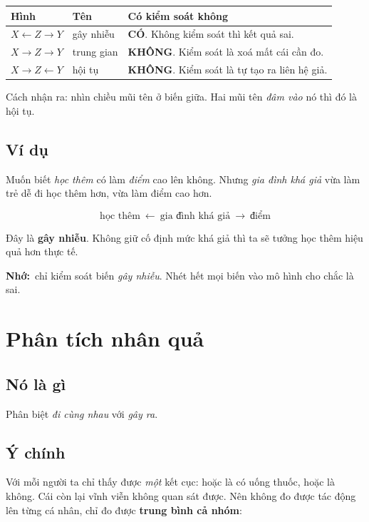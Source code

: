 \documentclass[12pt]{article}
\newcommand{\nho}{\textbf{Nhớ:}\ }
\begin{document}
\begin{center}
\begin{tabular}{@{}llp{5.6cm}@{}}
\toprule
\textbf{Hình} & \textbf{Tên} & \textbf{Có kiểm soát không} \\
\midrule
$X \leftarrow Z \to Y$ & gây nhiễu & \textbf{CÓ}. Không kiểm soát thì kết quả sai. \\
$X \to Z \to Y$ & trung gian & \textbf{KHÔNG}. Kiểm soát là xoá mất cái cần đo. \\
$X \to Z \leftarrow Y$ & hội tụ & \textbf{KHÔNG}. Kiểm soát là tự tạo ra liên hệ giả. \\
\bottomrule
\end{tabular}
\end{center}

Cách nhận ra: nhìn chiều mũi tên ở biến giữa. Hai mũi tên \emph{đâm vào} nó thì đó
là hội tụ.

\subsection*{Ví dụ}

Muốn biết \emph{học thêm} có làm \emph{điểm} cao lên không. Nhưng \emph{gia đình
khá giả} vừa làm trẻ dễ đi học thêm hơn, vừa làm điểm cao hơn.

\[
\text{học thêm} \ \leftarrow\ \text{gia đình khá giả} \ \to\ \text{điểm}
\]

Đây là \textbf{gây nhiễu}. Không giữ cố định mức khá giả thì ta sẽ tưởng học thêm
hiệu quả hơn thực tế.

\nho chỉ kiểm soát biến \emph{gây nhiễu}. Nhét hết mọi biến vào mô hình cho chắc là
sai.

\section{Phân tích nhân quả}

\subsection*{Nó là gì}

Phân biệt \emph{đi cùng nhau} với \emph{gây ra}.

\subsection*{Ý chính}

Với mỗi người ta chỉ thấy được \emph{một} kết cục: hoặc là có uống thuốc, hoặc là
không. Cái còn lại vĩnh viễn không quan sát được. Nên không đo được tác động lên
từng cá nhân, chỉ đo được \textbf{trung bình cả nhóm}:
\end{document}
